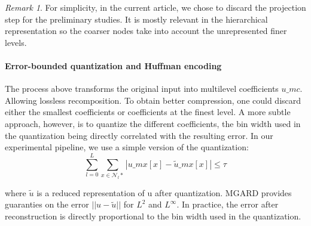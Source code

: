 \documentclass[conference]{IEEEtran}
\theoremstyle{remark}
\newtheorem{rmk}{Remark}
\begin{document}

\begin{rmk}
For simplicity, in the current article, we chose to discard the projection step for the preliminary studies. It is mostly relevant in the hierarchical representation so the coarser nodes take into account the unrepresented finer levels.
\end{rmk}
    
\paragraph{Error-bounded quantization and Huffman encoding}

The process above transforms the original input into multilevel coefficients $u\_mc$. Allowing lossless recomposition.
To obtain better compression, one could discard either the smallest coefficients or coefficients at the finest level.
A more subtle approach, however, is to quantize the different coefficients, the bin width used in the quantization being directly correlated with the resulting error.
In our experimental pipeline, we use a simple version of the quantization:
\[\sum_{l=0}^L\sum_{x\in \mathcal{N}_l*} |u\_mx[x]-\tilde{u}\_mx[x]| \leq \tau\]

where $\tilde{u}$ is a reduced representation of u after quantization.
MGARD provides guaranties on the error $||u-\tilde{u}||$ for $L^2$ and $L^\infty$. 
In practice, the error after reconstruction is directly proportional to the bin width used in the quantization.
\end{document}
